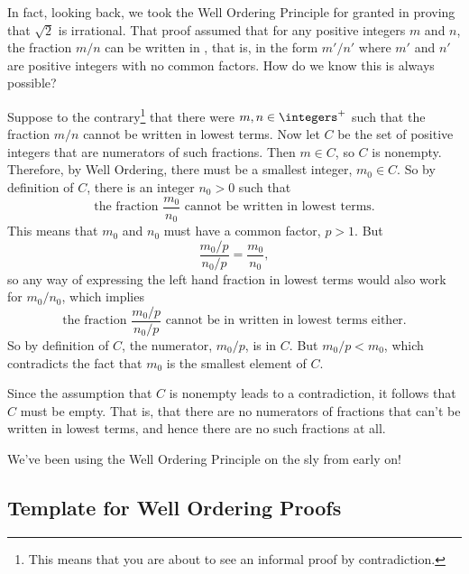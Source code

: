In fact, looking back, we took the Well Ordering Principle for granted in
proving that $\sqrt{2}$ is irrational.  That proof assumed that for any
positive integers $m$ and $n$, the fraction $m/n$ can be written in
, that is, in the form $m'/n'$ where $m'$ and $n'$
are positive integers with no common factors.  How do we know this is
always possible?

Suppose to the contrary\footnote{This means that you are about to see
an informal proof by contradiction.} that there were
$m,n \in \integers^+$ such that the fraction $m/n$ cannot be written
in lowest terms.  Now let $C$ be the set of positive integers that are
numerators of such fractions.  Then $m \in C$, so $C$ is nonempty.
Therefore, by Well Ordering, there must be a smallest integer,
$m_0 \in C$.  So by definition of $C$, there is an integer $n_0 > 0$
such that
\[
\text{the fraction } \frac{m_0}{n_0} \text{ cannot be written in lowest
terms.}
\]
This means that $m_0$ and $n_0$ must have a common factor, $p>1$.  But
\[
\frac{m_0/p}{n_0/p} = \frac{m_0}{n_0},
\]
so any way of expressing the left hand fraction in lowest terms would also
work for $m_0/n_0$, which implies
\[
\text{the fraction } \frac{m_0/p}{n_0/p} \text{ cannot be in written in
lowest terms either.}
\]
So by definition of $C$, the numerator, $m_0/p$, is in $C$.  But $m_0/p <
m_0$, which contradicts the fact that $m_0$ is the smallest element of $C$.

Since the assumption that $C$ is nonempty leads to a contradiction, it
follows that $C$ must be empty.  That is, that there are no numerators of
fractions that can't be written in lowest terms, and hence there are no
such fractions at all.

We've been using the Well Ordering Principle on the sly from early on!

\subsection{Template for Well Ordering Proofs}

